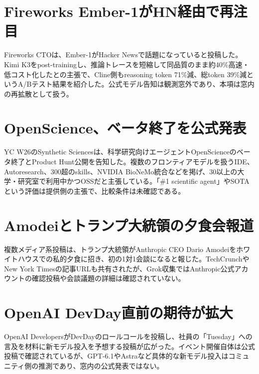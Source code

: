 \section{Fireworks Ember-1がHN経由で再注目}
Fireworks CTOは、Ember-1がHacker Newsで話題になっていると投稿した。Kimi K3をpost-trainingし、推論トレースを短縮して同品質のまま約40\%高速・低コスト化したとの主張で、Cline側もreasoning token 71\%減、総token 39\%減というA/Bテスト結果を紹介した。公式モデル告知は観測窓外であり、本項は窓内の再拡散として扱う。

\section{OpenScience、ベータ終了を公式発表}
YC W26のSynthetic Sciencesは、科学研究向けエージェントOpenScienceのベータ終了とProduct Hunt公開を告知した。複数のフロンティアモデルを扱うIDE、Autoresearch、300超のskills、NVIDIA BioNeMo統合などを掲げ、30以上の大学・研究室で利用中かつOSSだと主張している。「\#1 scientific agent」やSOTAという評価は提供側の主張で、比較条件は未確認である。

\section{Amodeiとトランプ大統領の夕食会報道}
複数メディア系投稿は、トランプ大統領がAnthropic CEO Dario Amodeiをホワイトハウスでの私的夕食に招き、初の1対1会談になると報じた。TechCrunchやNew York Timesの記事URLも共有されたが、Grok収集ではAnthropic公式アカウントの確認投稿や会談議題の詳細は確認されていない。

\section{OpenAI DevDay直前の期待が拡大}
OpenAI DevelopersがDevDayのロールコールを投稿し、社員の「Tuesday」への言及を材料に新モデル投入を予想する投稿が広がった。イベント開催自体は公式投稿で確認されているが、GPT-6.1やAstraなど具体的な新モデル投入はコミュニティ側の推測であり、窓内の公式発表ではない。

